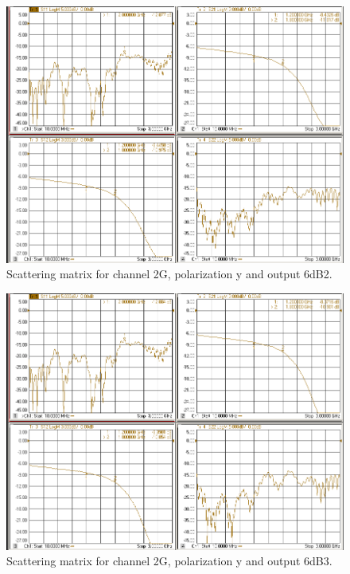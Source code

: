 \documentclass[12pt,a4paper,oneside]{article}
\begin{document}
\begin{figure}[H]
\centering
\includegraphics[width=0.9\linewidth]{VNA_results/2Gy_6dB2.png}
\caption{Scattering matrix for channel 2G, polarization y and output 6dB2.}
\label{fig:2Gy_6dB2}
\end{figure}


\begin{figure}[H]
\centering
\includegraphics[width=0.9\linewidth]{VNA_results/2Gy_6dB3.png}
\caption{Scattering matrix for channel 2G, polarization y and output 6dB3.}
\label{fig:2Gy_6dB3}
\end{figure}
\end{document}
